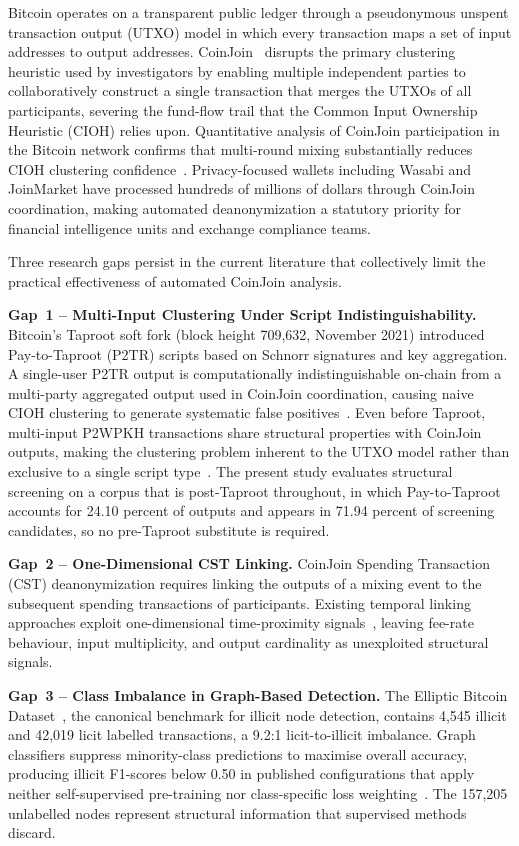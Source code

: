 \documentclass[12pt,a4paper]{article}
\begin{document}
Bitcoin operates on a transparent public ledger through a
pseudonymous unspent transaction output (UTXO) model in
which every transaction maps a set of input addresses to
output addresses. CoinJoin~\citep{coinjoin2024tdsc} disrupts the
primary clustering heuristic used by investigators by enabling
multiple independent parties to collaboratively construct a
single transaction that merges the UTXOs of all participants,
severing the
fund-flow trail that the Common Input Ownership Heuristic
(CIOH) relies upon. Quantitative analysis of CoinJoin
participation in the Bitcoin network confirms that multi-round
mixing substantially reduces CIOH clustering
confidence~\citep{coinjoin2024tdsc}. Privacy-focused wallets
including Wasabi and JoinMarket have processed hundreds of
millions of dollars through CoinJoin coordination, making
automated deanonymization a statutory priority for financial
intelligence units and exchange compliance teams.

Three research gaps persist in the current literature that
collectively limit the practical effectiveness of automated
CoinJoin analysis.

\textbf{Gap~1 -- Multi-Input Clustering Under Script
Indistinguishability.}
Bitcoin's Taproot soft fork (block height 709,632, November
2021) introduced Pay-to-Taproot (P2TR) scripts based on
Schnorr signatures and key aggregation. A single-user P2TR
output is computationally indistinguishable on-chain from a
multi-party aggregated output used in CoinJoin coordination,
causing naive CIOH clustering to generate systematic false
positives~\citep{lee2024}. Even before Taproot, multi-input
P2WPKH transactions share structural properties with
CoinJoin outputs, making the clustering problem inherent to
the UTXO model rather than exclusive to a single script
type~\citep{asiri2025}. The present study evaluates structural
screening on a corpus that is post-Taproot throughout, in which
Pay-to-Taproot accounts for 24.10 percent of outputs and appears
in 71.94 percent of screening candidates, so no pre-Taproot
substitute is required.

\textbf{Gap~2 -- One-Dimensional CST Linking.}
CoinJoin Spending Transaction (CST) deanonymization requires
linking the outputs of a mixing event to the subsequent
spending transactions of participants. Existing temporal
linking approaches exploit one-dimensional time-proximity
signals~\citep{chen2025multi}, leaving fee-rate
behaviour, input multiplicity, and output cardinality as
unexploited structural signals.

\textbf{Gap~3 -- Class Imbalance in Graph-Based Detection.}
The Elliptic Bitcoin Dataset~\citep{fan2024gnn}, the canonical
benchmark for illicit node detection, contains 4,545 illicit
and 42,019 licit labelled transactions, a 9.2:1
licit-to-illicit imbalance. Graph classifiers suppress
minority-class predictions to maximise overall accuracy,
producing illicit F1-scores below 0.50 in published
configurations that apply neither self-supervised pre-training
nor class-specific loss weighting~\citep{alarab2024}. The 157,205 unlabelled
nodes represent structural information that supervised
methods discard.
\end{document}

